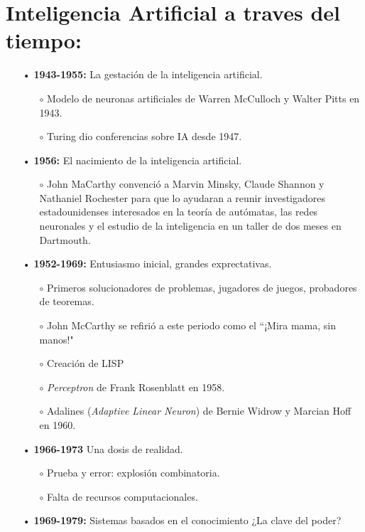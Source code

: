 \documentclass[12pt,a4paper]{book}
\begin{document}
\section*{ Inteligencia Artificial a traves del tiempo:}
\begin{enumerate}
\item[•] \textbf{1943-1955:} La gestación de la inteligencia artificial.
 \begin{enumerate}
  \item[$\circ$] Modelo de neuronas artificiales de Warren McCulloch y Walter Pitts en 1943.
  \item[$\circ$] Turing dio conferencias sobre IA desde 1947.
 \end{enumerate}
\item[•] \textbf{1956:} El nacimiento de la inteligencia artificial.
 \begin{enumerate}
 \item[$\circ$] John MaCarthy convenció a Marvin Minsky, Claude Shannon y Nathaniel Rochester para que lo ayudaran a reunir investigadores estadounidenses interesados en la teoría de autómatas, las redes neuronales y el estudio de la inteligencia en un taller de dos meses en Dartmouth.
 \end{enumerate}
\item[•] \textbf{1952-1969:} Entusiasmo inicial, grandes exprectativas.
 \begin{enumerate}
 \item[$\circ$] Primeros solucionadores de problemas, jugadores de juegos, probadores de teoremas.
 \item[$\circ$] John McCarthy se refirió a este periodo como el ``¡Mira mama, sin manos!"
 \item[$\circ$] Creación de LISP
 \item[$\circ$] \textsl{Perceptron} de Frank Rosenblatt en 1958.
 \item[$\circ$] Adalines (\textsl{Adaptive Linear Neuron}) de Bernie Widrow y Marcian Hoff en 1960.
 \end{enumerate}
\item[•] \textbf{1966-1973} Una dosis de realidad.
 \begin{enumerate} 
 \item[$\circ$] Prueba y error: explosión combinatoria.
 \item[$\circ$] Falta de recursos computacionales. 
 \end{enumerate}
\item[•] \textbf{1969-1979:} Sistemas basados en el conocimiento ¿La clave del poder?

\end{enumerate}
\end{document}
